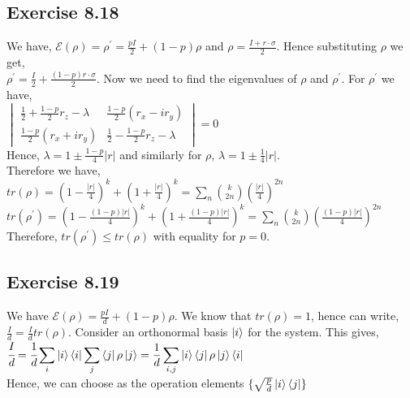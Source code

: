 \documentclass[a4paper,12pt]{article}
\begin{document}
\subsection*{Exercise 8.18}
We have, $\mathcal{E}(\rho)=\rho^\prime=\displaystyle \frac{pI}{2}+(1-p)\rho$ and
$\rho=\displaystyle\frac{I+r\cdot\sigma}{2}$. Hence substituting $\rho$ we get,\\
$\rho^\prime=\displaystyle \frac{I}{2}+\frac{(1-p)r\cdot\sigma}{2}$.
Now we need to find the eigenvalues of $\rho$ and $\rho^\prime$. For $\rho^\prime$ we have,\\
$\begin{vmatrix}
    \frac{1}{2}+\frac{1-p}{2}r_z-\lambda & \frac{1-p}{2}(r_x-ir_y)\\
    \frac{1-p}{2}(r_x+ir_y) &      \frac{1}{2}-\frac{1-p}{2}r_z-\lambda
\end{vmatrix}
=0$\\
Hence, $\lambda=1\pm\frac{1-p}{4}|r|$ and similarly for $\rho$, $\lambda=1\pm\frac{1}{4}|r|$.\\
Therefore we have,\\
$tr(\rho)=(1-\frac{|r|}{4})^k+(1+\frac{|r|}{4})^k=\displaystyle \sum_{n}{k\choose 2n}\left(\frac{|r|}{4}\right)^{2n}$\\
$tr(\rho^\prime)=(1-\frac{(1-p)|r|}{4})^k+(1+\frac{(1-p)|r|}{4})^k=\displaystyle \sum_{n}{k\choose 2n}\left(\frac{(1-p)|r|}{4}\right)^{2n}$\\
Therefore, $tr(\rho^\prime)\leq tr(\rho)$ with equality for $p=0$.

\subsection*{Exercise 8.19}
We have $\mathcal{E}(\rho)=\frac{pI}{d}+(1-p)\rho$. We know that $tr(\rho)=1$, hence can write,
$\frac{I}{d}=\frac{I}{d}tr(\rho)$. Consider an orthonormal basis $\ket{i}$ for the system. This gives,\\
$\cfrac{I}{d}=\displaystyle \cfrac{1}{d}\sum_i \ket{i}\bra{i}\sum_j \bra{j}\rho\ket{j}=
\displaystyle \frac{1}{d}\sum_{i,j} \ket{i} \bra{j}\rho\ket{j}\bra{i}$\\
Hence, we can choose as the operation elements $\{\sqrt{\frac{p}{d}}\ket{i}\bra{j}\}$
\end{document}
